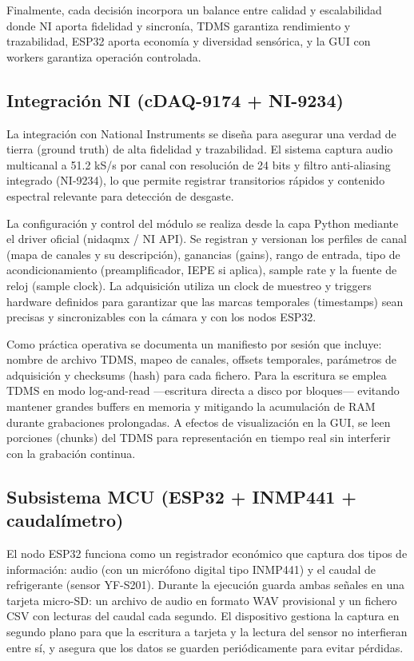 \documentclass[12pt, letterpaper]{report}
\begin{document}
Finalmente, cada decisión incorpora un balance entre calidad y escalabilidad donde NI aporta fidelidad y sincronía, TDMS garantiza rendimiento y trazabilidad, ESP32 aporta economía y diversidad sensórica, y la GUI con workers garantiza operación controlada.

\subsection{Integración NI (cDAQ-9174 + NI-9234)}

La integración con National Instruments se diseña para asegurar una verdad de tierra (ground truth) de alta fidelidad y trazabilidad. El sistema captura audio multicanal a 51.2 kS/s por canal con resolución de 24 bits y filtro anti-aliasing integrado (NI-9234), lo que permite registrar transitorios rápidos y contenido espectral relevante para detección de desgaste.

La configuración y control del módulo se realiza desde la capa Python mediante el driver oficial (nidaqmx / NI API). Se registran y versionan los perfiles de canal (mapa de canales y su descripción), ganancias (gains), rango de entrada, tipo de acondicionamiento (preamplificador, IEPE si aplica), sample rate y la fuente de reloj (sample clock). La adquisición utiliza un clock de muestreo y triggers hardware definidos para garantizar que las marcas temporales (timestamps) sean precisas y sincronizables con la cámara y con los nodos ESP32.

Como práctica operativa se documenta un manifiesto por sesión que incluye: nombre de archivo TDMS, mapeo de canales, offsets temporales, parámetros de adquisición y checksums (hash) para cada fichero. Para la escritura se emplea TDMS en modo log-and-read ---escritura directa a disco por bloques--- evitando mantener grandes buffers en memoria y mitigando la acumulación de RAM durante grabaciones prolongadas. A efectos de visualización en la GUI, se leen porciones (chunks) del TDMS para representación en tiempo real sin interferir con la grabación continua.

\subsection{Subsistema MCU (ESP32 + INMP441 + caudalímetro)}

El nodo ESP32 funciona como un registrador económico que captura dos tipos de información: audio (con un micrófono digital tipo INMP441) y el caudal de refrigerante (sensor YF-S201). Durante la ejecución guarda ambas señales en una tarjeta micro-SD: un archivo de audio en formato WAV provisional y un fichero CSV con lecturas del caudal cada segundo. El dispositivo gestiona la captura en segundo plano para que la escritura a tarjeta y la lectura del sensor no interfieran entre sí, y asegura que los datos se guarden periódicamente para evitar pérdidas.
\end{document}
